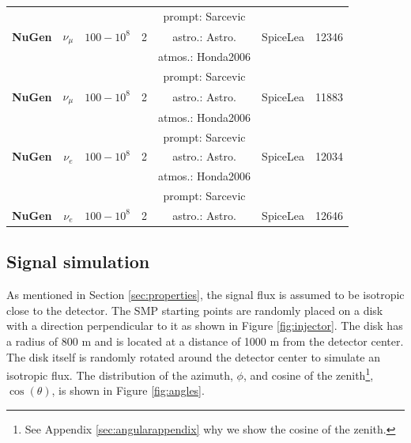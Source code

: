 \begin{table}[]
{\begin{tabular}{|l |c|c|c|c|c|r|}
 &  &  &  & prompt: Sarcevic &  &  \\
\multirow{-3}{*}{\textbf{NuGen}} & \multirow{-3}{*}{$\nu_\mu$} & \multirow{-3}{*}{$100 - 10^8$} & \multirow{-3}{*}{2} & astro.: Astro. & \multirow{-3}{*}{SpiceLea} & \multirow{-3}{*}{12346} \\ \hline
 &  &  &  & atmos.: Honda2006 &  &  \\
 &  &  &  & prompt: Sarcevic &  &  \\
\multirow{-3}{*}{\textbf{NuGen}} & \multirow{-3}{*}{$\nu_\mu$} & \multirow{-3}{*}{$100 - 10^8$} & \multirow{-3}{*}{2} & astro.: Astro. & \multirow{-3}{*}{SpiceLea} & \multirow{-3}{*}{11883} \\ \hline
 &  &  &  & atmos.: Honda2006 &  &  \\
 &  &  &  & prompt: Sarcevic &  &  \\
\multirow{-3}{*}{\textbf{NuGen}} & \multirow{-3}{*}{$\nu_e$} & \multirow{-3}{*}{$100 - 10^8$} & \multirow{-3}{*}{2} & astro.: Astro. & \multirow{-3}{*}{SpiceLea} & \multirow{-3}{*}{12034} \\ \hline
 &  &  &  & atmos.: Honda2006 &  &  \\
 &  &  &  & prompt: Sarcevic &  &  \\
\multirow{-3}{*}{\textbf{NuGen}} & \multirow{-3}{*}{$\nu_e$} & \multirow{-3}{*}{$100 - 10^8$} & \multirow{-3}{*}{2} & astro.: Astro. & \multirow{-3}{*}{SpiceLea} & \multirow{-3}{*}{12646} \\ \hline
\end{tabular}%
}
\end{table}

\subsection{Signal simulation}
As mentioned in Section \ref{sec:properties}, the signal flux is assumed to be isotropic close to the detector. The SMP starting points are randomly placed on a disk with a direction perpendicular to it as shown in Figure \ref{fig:injector}. The disk has a radius of 800 m and is located at a distance of 1000 m from the detector center. The disk itself is randomly rotated around the detector center to simulate an isotropic flux. The distribution of the azimuth, $\phi$, and cosine of the zenith\footnote{See Appendix \ref{sec:angularappendix} why we show the cosine of the zenith.}, $\cos(\theta)$, is shown in Figure \ref{fig:angles}.\\

